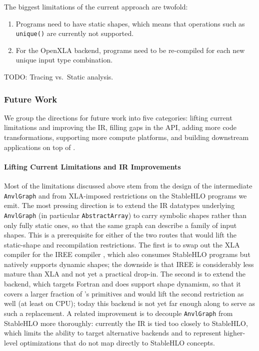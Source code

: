 The biggest limitations of the current approach are twofold:

\begin{enumerate}
\def\labelenumi{\alph{enumi})}
\tightlist
\item
  Programs need to have static shapes, which means that operations such as \texttt{unique()} are currently not supported.
\item
  For the OpenXLA backend, programs need to be re-compiled for each new unique input type combination.
\end{enumerate}

TODO: Tracing vs.~Static analysis.

\subsubsection{Future Work}\label{future-work}

We group the directions for future work into five categories: lifting current limitations and improving the IR, filling gaps in the API, adding more code transformations, supporting more compute platforms, and building downstream applications on top of .

\paragraph{Lifting Current Limitations and IR Improvements}\label{lifting-current-limitations-and-ir-improvements}

Most of the limitations discussed above stem from the design of the intermediate \texttt{AnvlGraph} and from XLA-imposed restrictions on the StableHLO programs we emit.
The most pressing direction is to extend the IR datatypes underlying \texttt{AnvlGraph} (in particular \texttt{AbstractArray}) to carry symbolic shapes rather than only fully static ones, so that the same graph can describe a family of input shapes.
This is a prerequisite for either of the two routes that would lift the static-shape and recompilation restrictions.
The first is to swap out the XLA compiler for the IREE compiler \citep{ref-iree}, which also consumes StableHLO programs but natively supports dynamic shapes; the downside is that IREE is considerably less mature than XLA and not yet a practical drop-in.
The second is to extend the  backend, which targets Fortran and does support shape dynamism, so that it covers a larger fraction of 's primitives and would lift the second restriction as well (at least on CPU); today this backend is not yet far enough along to serve as such a replacement.
A related improvement is to decouple \texttt{AnvlGraph} from StableHLO more thoroughly: currently the IR is tied too closely to StableHLO, which limits the ability to target alternative backends and to represent higher-level optimizations that do not map directly to StableHLO concepts.

